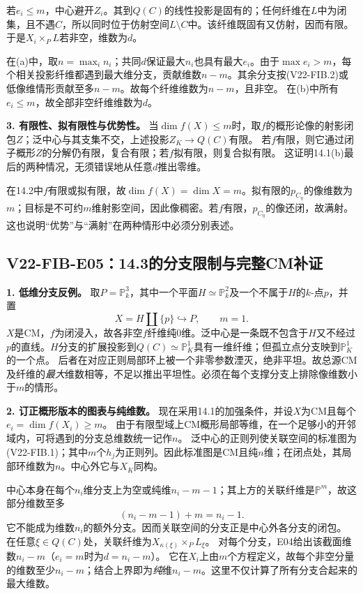 \documentclass[UTF8,a4paper]{ctexbook}
\begin{document}
若$e_i\leq m$，中心避开$Z_i$。其到$Q(C)$的线性投影是固有的；任何纤维在$L$中为闭集，且不遇$C$，所以同时位于仿射空间$L\setminus C$中。该纤维既固有又仿射，因而有限。于是$X_i\times_P L$若非空，维数为$d$。

在(a)中，取$n=\max_i n_i$；共同$d$保证最大$n_i$也具有最大$e_i$。由于$\max e_i>m$，每个相关投影纤维都遇到最大维分支，贡献维数$n-m$。其余分支按(V22-FIB.2)或低像维情形贡献至多$n-m$。故每个纤维维数为$n-m$，且非空。
在(b)中所有$e_i\leq m$，故全部非空纤维维数为$d$。

\noindent\textbf{3. 有限性、拟有限性与优势性。}
当$\dim f(X)\leq m$时，取$f$的概形论像的射影闭包$Z$；泛中心与其支集不交，上述投影$Z_K\to Q(C)$有限。
若$f$有限，则它通过闭子概形$Z$的分解仍有限，复合有限；若$f$拟有限，则复合拟有限。
这证明14.1(b)最后的两种情况，无须错误地从任意$d$推出零维。

在14.2中$f$有限或拟有限，故$\dim f(X)=\dim X=m$。拟有限的$p_{C_\eta}$的像维数为$m$；目标是不可约$m$维射影空间，因此像稠密。若$f$有限，$p_{C_\eta}$的像还闭，故满射。这也说明“优势”与“满射”在两种情形中必须分别表述。

\subsection*{V22-FIB-E05：14.3的分支限制与完整CM补证}

\noindent\textbf{1. 低维分支反例。}
取$P=\mathbb P^3_k$，其中一个平面$H\simeq\mathbb P^2_k$及一个不属于$H$的$k$-点$p$，并置
\[
X=H\amalg\{p\}\hookrightarrow P,\qquad m=1.
\]
$X$是CM，$f$为闭浸入，故各非空$f$纤维纯0维。泛中心是一条既不包含于$H$又不经过$p$的直线。$H$分支的扩展投影到$Q(C)\simeq\mathbb P^1_K$具有一维纤维；但孤立点分支映到$\mathbb P^1_K$的一个点。
后者在对应正则局部环上被一个非零参数湮灭，绝非平坦。故总源CM及纤维的\emph{最大}维数相等，不足以推出平坦性。必须在每个支撑分支上排除像维数小于$m$的情形。

\noindent\textbf{2. 订正概形版本的图表与纯维数。}
现在采用14.1的加强条件，并设$X$为CM且每个$e_i=\dim f(X_i)\geq m$。
由于有限型域上CM概形局部等维，在一个足够小的开邻域内，可将遇到的分支总维数统一记作$n$。
泛中心的正则列使关联空间的标准图为(V22-FIB.1)；其中$m$个$h_j$为正则列。因此标准图是CM且纯$n$维；在闭点处，其局部环维数为$n$。中心外它与$X_K$同构。

中心本身在每个$n_i$维分支上为空或纯维$n_i-m-1$；其上方的关联纤维是$\mathbb P^m$，故这部分维数至多
\[
(n_i-m-1)+m=n_i-1.
\]
它不能成为维数$n_i$的额外分支。因而关联空间的分支正是中心外各分支的闭包。
在任意$\xi\in Q(C)$处，关联纤维为$X_{\kappa(\xi)}\times_P L_\xi$。
对每个分支，E04给出该截面维数$n_i-m$（$e_i=m$时为$d=n_i-m$）。
它在$X_i$上由$m$个方程定义，故每个非空分量的维数至少$n_i-m$；结合上界即为\emph{纯}维$n_i-m$。这里不仅计算了所有分支合起来的最大维数。
\end{document}
